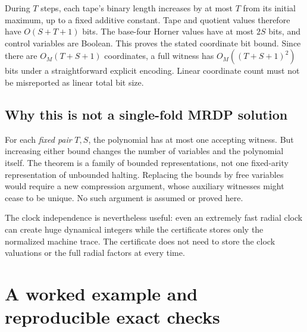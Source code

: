 \documentclass[11pt,letterpaper]{article}
\numberwithin{equation}{section}
\theoremstyle{definition}
\theoremstyle{remark}
\newcommand{\srcmark}[1]{\par\noindent{\small\itshape [source~#1]}\par}
\begin{document}
During $T$ steps, each tape's binary length increases by at most $T$ from
its initial maximum, up to a fixed additive constant. Tape and quotient
values therefore have $O(S+T+1)$ bits. The base-four Horner values have at
most $2S$ bits, and control variables are Boolean. This proves the stated
coordinate bit bound. Since there are $O_M(T+S+1)$ coordinates, a full
witness has $O_M((T+S+1)^2)$ bits under a straightforward explicit encoding.
Linear coordinate count must not be misreported as linear total bit size.

\subsection{Why this is not a single-fold MRDP solution}
For each \emph{fixed pair} $T,S$, the polynomial has at most one accepting
witness. But increasing either bound changes the number of variables and
the polynomial itself. The theorem is a family of bounded representations,
not one fixed-arity representation of unbounded halting. Replacing the
bounds by free variables would require a new compression argument, whose
auxiliary witnesses might cease to be unique. No such argument is assumed
or proved here.

The clock independence is nevertheless useful: even an extremely fast
radial clock can create huge dynamical integers while the certificate stores
only the normalized machine trace. The certificate does not need to store
the clock valuations or the full radial factors at every time.

\section{A worked example and reproducible exact checks}\label{pqc:ad:sec:verification}
\srcmark{12}
\end{document}
